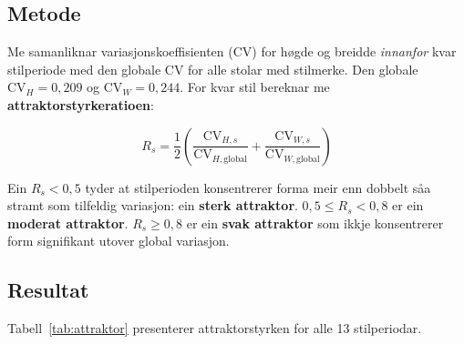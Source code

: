 \documentclass[10pt, a4paper, twocolumn]{article}
\begin{document}
\subsection{Metode}

Me samanliknar variasjonskoeffisienten (CV) for h\o gde og breidde \emph{innanfor} kvar stilperiode med den globale CV for alle stolar med stilmerke. Den globale $\text{CV}_H = 0{,}209$ og $\text{CV}_W = 0{,}244$. For kvar stil bereknar me \textbf{attraktorstyrkeratioen}:

\begin{equation}
  R_s = \frac{1}{2}\left(\frac{\text{CV}_{H,s}}{\text{CV}_{H,\text{global}}} + \frac{\text{CV}_{W,s}}{\text{CV}_{W,\text{global}}}\right)
\end{equation}

Ein $R_s < 0{,}5$ tyder at stilperioden konsentrerer forma meir enn dobbelt s\r{a}a stramt som tilfeldig variasjon: ein \textbf{sterk attraktor}. $0{,}5 \leq R_s < 0{,}8$ er ein \textbf{moderat attraktor}. $R_s \geq 0{,}8$ er ein \textbf{svak attraktor} som ikkje konsentrerer form signifikant utover global variasjon.


\subsection{Resultat}

Tabell~\ref{tab:attraktor} presenterer attraktorstyrken for alle 13 stilperiodar.
\end{document}
